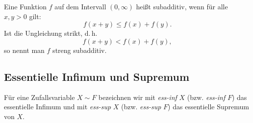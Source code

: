 \documentclass[
12pt,
fancyheadings, %
%
a4paper, 
%
]{tuhhreprt}
\begin{document}
Eine Funktion \( f \) auf dem Intervall \( (0, \infty) \) heißt subadditiv, wenn für alle \( x, y > 0 \) gilt:
\[
f(x + y) \leq f(x) + f(y).
\]
Ist die Ungleichung strikt, d.\,h.
\[
f(x + y) < f(x) + f(y),
\]
so nennt man \( f \) streng subadditiv.

\subsection{Essentielle Infimum und Supremum}

Für eine Zufallsvariable \( X \sim F \) bezeichnen wir mit \textit{ess-inf} \( X \) (bzw. \textit{ess-inf} \( F \)) das essentielle Infimum und mit \textit{ess-sup} \( X \) (bzw. \textit{ess-sup} \( F \)) das essentielle Supremum von \( X \).

\backmatter
{}


\end{document}
